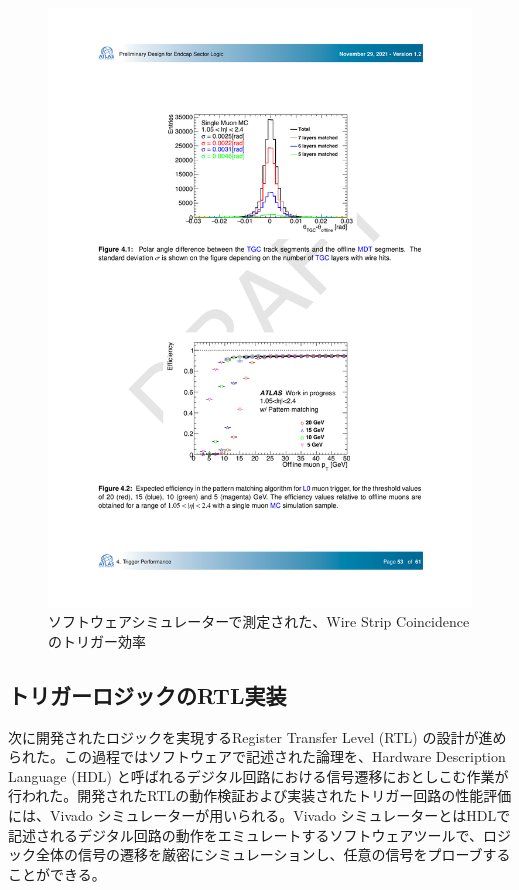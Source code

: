 \begin{figure} 
\centering
\includegraphics[width=16cm]{fig/Test/Soft_WS.pdf}
\caption[ソフトウェアシミュレーターで測定された、Wire Strip Coincidenceのトリガー効率]{ソフトウェアシミュレーターで測定された、Wire Strip Coincidenceのトリガー効率\cite{SLPDR}}
\label{Soft_WS}
\end{figure}

\subsection*{トリガーロジックのRTL実装}
次に開発されたロジックを実現するRegister Transfer Level (RTL) の設計が進められた。この過程ではソフトウェアで記述された論理を、Hardware Description Language (HDL) と呼ばれるデジタル回路における信号遷移におとしこむ作業が行われた。開発されたRTLの動作検証および実装されたトリガー回路の性能評価には、Vivado シミュレーターが用いられる。Vivado シミュレーターとはHDLで記述されるデジタル回路の動作をエミュレートするソフトウェアツールで、ロジック全体の信号の遷移を厳密にシミュレーションし、任意の信号をプローブすることができる。

